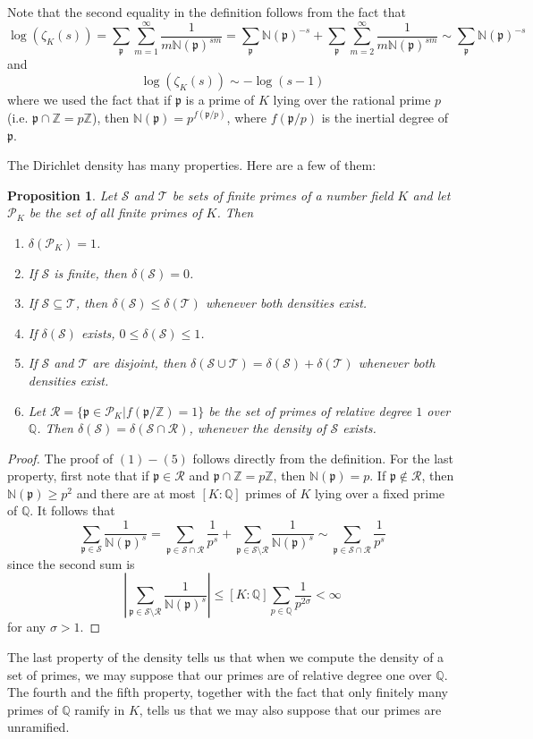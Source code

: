 \documentclass[]{amsart}
\newtheorem{prop}{Proposition}
\newcommand{\Z}{\mathbb{Z}}
\newcommand{\Q}{\mathbb{Q}}
\renewcommand{\S}{\mathcal{S}}
\newcommand{\RR}{\mathcal{R}}
\newcommand{\dS}{\delta(\mathcal{S})}
\newcommand{\N}{\mathbb{N}}
\newcommand{\p}{\mathfrak{p}}
\begin{document}
			Note that the second equality in the definition follows from the fact that
			\[\log(\zeta_K(s))=\sum_{\p}\sum_{m=1}^{\infty}\frac{1}{m\N(\p)^{sm}}=\sum_{\p}\N(\p)^{-s}+\sum_{\p}\sum_{m=2}^{\infty}\frac{1}{m\N(\p)^{sm}}\sim\sum_{\p}\N(\p)^{-s}\]
			and
			\[\log(\zeta_K(s))\sim-\log(s-1)\]
			where we used the fact that if $\p$ is a prime of $K$ lying over the rational prime $p$ (i.e. $\p\cap\Z=p\Z$), then $\N(\p)=p^{f(\p/p)}$, where $f(\p/p)$ is the inertial degree of $\p$.
			
			The Dirichlet density has many properties. Here are a few of them:
			\begin{prop}
				Let $\S$ and $\mathcal{T}$ be sets of finite primes of a number field $K$ and let $\mathcal{P}_K$ be the set of all finite primes of $K$. Then 
				\begin{enumerate}
					\item $\delta(\mathcal{P}_K)=1$.
					\item If $\S$ is finite, then $\delta(\S)=0$.
					\item If $\S\subseteq\mathcal{T}$, then $\delta(\S)\leq\delta(\mathcal{T})$ whenever both densities exist.
					\item If $\dS$ exists, $0\leq \dS\leq 1$.
					\item If $\S$ and $\mathcal{T}$ are disjoint, then $\delta(\S\cup\mathcal{T})=\delta(\S)+\delta(\mathcal{T})$ whenever both densities exist. 
					\item Let $\mathcal{R}=\{\p\in\mathcal{P}_K|f(\p/\Z)=1\}$ be the set of primes of relative degree $1$ over $\Q$. Then $\delta(\S)=\delta(\S\cap\mathcal{R})$, whenever the density of $\S$ exists. 
				\end{enumerate}
			\end{prop}
			\begin{proof}
				The proof of $(1)-(5)$ follows directly from the definition. For the last property, first note that if $\p\in\RR$ and $\p\cap\Z=p\Z$, then $\N(\p)=p$. If $\p\not\in\RR$, then $\N(\p)\geq p^2$ and there are at most $[K:\Q]$ primes of $K$ lying over a fixed prime of $\Q$. It follows that
				\[\sum_{\p\in\S}\frac{1}{\N(\p)^s}=\sum_{\p\in\S\cap\RR}\frac{1}{p^{s}}+\sum_{\p\in\S\setminus\RR}\frac{1}{\N(\p)^s}\sim\sum_{\p\in\S\cap\RR}\frac{1}{p^{s}}\]
				since the second sum is
				\[\left |\sum_{\p\in\S\setminus\RR}\frac{1}{\N(\p)^s}\right |\leq[K:\Q]\sum_{p\in\Q}\frac{1}{p^{2\sigma}}<\infty\]
				for any $\sigma>1$.
			\end{proof}
			
			The last property of the density tells us that when we compute the density of a set of primes, we may suppose that our primes are of relative degree one over $\Q$. The fourth and the fifth property, together with the fact that only finitely many primes of $\Q$ ramify in $K$, tells us that we may also suppose that our primes are unramified.
			
\end{document}
